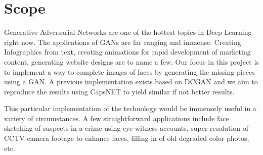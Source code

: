 {\chapter{Scope}\label{ch:scope}}
Generative Adversarial Networks are one of the hottest topics in Deep Learning right now. The applications of GANs are far ranging and immense. Creating Infographics from text, creating animations for rapid development of marketing content, generating website designs are to name a few. Our focus in this project is to implement a way to complete images of faces by generating the missing pieces using a GAN. A previous implementation exists based on DCGAN and we aim to reproduce the results using CapsNET to yield similar if not better results.\par\bigskip
This particular implementation of the technology would be immensely useful in a variety of circumstances. A few straightforward applications include face sketching of suspects in a crime using eye witness accounts, super resolution of CCTV camera footage to enhance faces, filling in of old degraded color photos, etc.